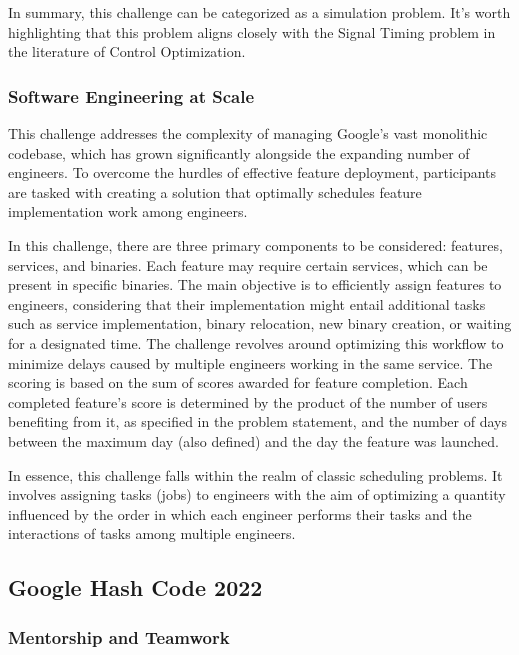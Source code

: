 In summary, this challenge can be categorized as a simulation problem. It's
worth highlighting that this problem aligns closely with the Signal Timing
problem in the literature of Control Optimization.

\subsubsection*{Software Engineering at Scale}
\label{subsubsec:hashcode-2021-final}

This challenge addresses the complexity of managing Google's vast monolithic
codebase, which has grown significantly alongside the expanding number of
engineers. To overcome the hurdles of effective feature deployment, participants
are tasked with creating a solution that optimally schedules feature
implementation work among engineers.

In this challenge, there are three primary components to be considered: features,
services, and binaries. Each feature may require certain services, which can be
present in specific binaries. The main objective is to efficiently assign
features to engineers, considering that their implementation might entail
additional tasks such as service implementation, binary relocation, new binary
creation, or waiting for a designated time. The challenge revolves around
optimizing this workflow to minimize delays caused by multiple engineers working
in the same service. The scoring is based on the sum of scores awarded for
feature completion. Each completed feature's score is determined by the product
of the number of users benefiting from it, as specified in the problem
statement, and the number of days between the maximum day (also defined) and the
day the feature was launched.

In essence, this challenge falls within the realm of classic scheduling
problems. It involves assigning tasks (jobs) to engineers with the aim of
optimizing a quantity influenced by the order in which each engineer performs
their tasks and the interactions of tasks among multiple engineers.

\subsection{Google Hash Code 2022}
\label{subsec:hashcode-2022}

\subsubsection*{Mentorship and Teamwork}
\label{subsubsec:hashcode-2022-qualification}

